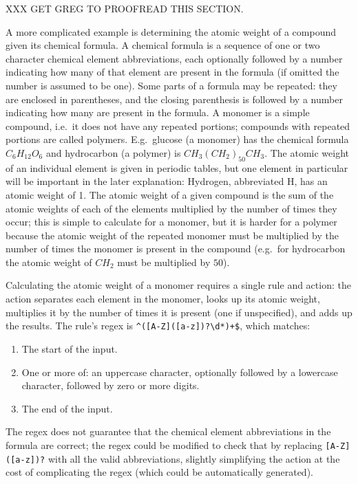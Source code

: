 XXX GET GREG TO PROOFREAD THIS SECTION\@.

A more complicated example is determining the atomic weight of a compound
given its chemical formula.  A chemical formula is a sequence of one or two
character chemical element abbreviations, each optionally followed by a
number indicating how many of that element are present in the formula (if
omitted the number is assumed to be one).  Some parts of a formula may be
repeated: they are enclosed in parentheses, and the closing parenthesis is
followed by a number indicating how many are present in the formula.  A
monomer is a simple compound, i.e.\ it does not have any repeated portions;
compounds with repeated portions are called polymers.  E.g.\ glucose (a
monomer) has the chemical formula $C_{6}H_{12}O_{6}$ and hydrocarbon (a
polymer) is $CH_{3}{(CH_{2})}_{50}CH_{3}$.  The atomic weight of an
individual element is given in periodic tables, but one element in
particular will be important in the later explanation: Hydrogen,
abbreviated H, has an atomic weight of 1.  The atomic weight of a given
compound is the sum of the atomic weights of each of the elements
multiplied by the number of times they occur; this is simple to calculate
for a monomer, but it is harder for a polymer because the atomic weight of
the repeated monomer must be multiplied by the number of times the monomer
is present in the compound (e.g.\ for hydrocarbon the atomic weight of
$CH_{2}$ must be multiplied by $50$).

Calculating the atomic weight of a monomer requires a single rule and
action: the action separates each element in the monomer, looks up its
atomic weight, multiplies it by the number of times it is present (one if
unspecified), and adds up the results.  The rule's regex is
\verb!^([A-Z]([a-z])?\d*)+$!, which matches:

\begin{enumerate}

    \squeezeitems{}

    \item The start of the input.

    \item One or more of: an uppercase character, optionally followed by a
        lowercase character, followed by zero or more digits.

    \item The end of the input.

\end{enumerate}

The regex does not guarantee that the chemical element abbreviations in the
formula are correct; the regex could be modified to check that by replacing
\verb![A-Z]([a-z])?! with all the valid abbreviations, slightly simplifying
the action at the cost of complicating the regex (which could be
automatically generated).

